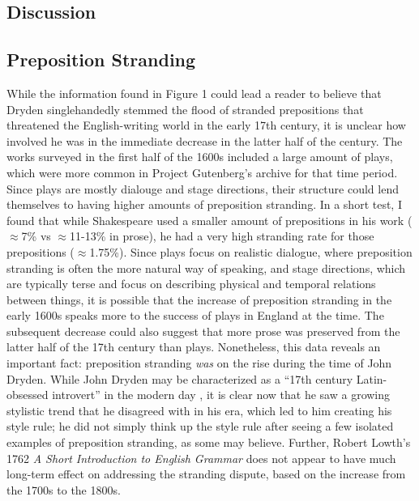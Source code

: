 \documentclass[DIV=calc, paper=letter, fontsize=12pt]{scrartcl}	 %
\begin{document}
\begin{multicols}{2}

\section{Discussion}

\subsection{Preposition Stranding}

While the information found in Figure 1 could lead a reader to believe that Dryden singlehandedly stemmed the flood of stranded prepositions that threatened the English-writing world in the early 17th century, it is unclear how involved he was in the immediate decrease in the latter half of the century. The works surveyed in the first half of the 1600s included a large amount of plays, which were more common in Project Gutenberg's archive for that time period. Since plays are mostly dialouge and stage directions, their structure could lend themselves to having higher amounts of preposition stranding. In a short test, I found that while Shakespeare used a smaller amount of prepositions in his work ($\approx$7\% vs $\approx$11-13\% in prose), he had a very high stranding rate for those prepositions ($\approx$1.75\%). Since plays focus on realistic dialogue, where preposition stranding is often the more natural way of speaking, and stage directions, which are typically terse and focus on describing physical and temporal relations between things, it is possible that the increase of preposition stranding in the early 1600s speaks more to the success of plays in England at the time. The subsequent decrease could also suggest that more prose was preserved from the latter half of the 17th century than plays.
Nonetheless, this data reveals an important fact: preposition stranding \emph{was} on the rise during the time of John Dryden. While John Dryden may be characterized as a ``17th century Latin-obsessed introvert'' in the modern day \cite{SMBC}, it is clear now that he saw a growing stylistic trend that he disagreed with in his era, which led to him creating his style rule; he did not simply think up the style rule after seeing a few isolated examples of preposition stranding, as some may believe. Further, Robert Lowth's 1762 \emph{A Short Introduction to English Grammar} does not appear to have much long-term effect on addressing the stranding dispute, based on the increase from the 1700s to the 1800s.


\end{multicols}
\end{document}
